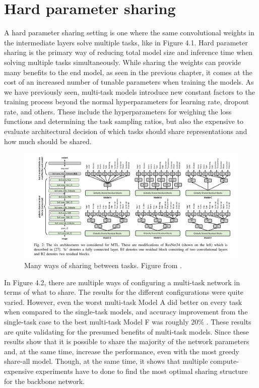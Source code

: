 \section{Hard parameter sharing}
A hard parameter sharing setting is one where the same convolutional weights in the intermediate layers solve multiple tasks, like in Figure 4.1.
Hard parameter sharing is the primary way of reducing total model size and inference time when solving multiple tasks simultaneously.
While sharing the weights can provide many benefits to the end model, as seen in the previous chapter, it comes at the cost of an increased number of tunable parameters when training the models. 
As we have previously seen, multi-task models introduce new constant factors to the training process beyond the normal hyperparameters for learning rate, dropout rate, and others.
These include the hyperparameters for weighing the loss functions and determining the task sampling ratios, but also the expensive to evaluate architectural decision of which tasks should share representations and how much should be shared.

\begin{figure}[h!] 
\centering 
\includegraphics[width=1\textwidth]{imgs/multipleShares.png}
\caption{Many ways of sharing between tasks. Figure from \citep{healthyDrink}.\label{fig:params}}
\end{figure}

In Figure 4.2, there are multiple ways of configuring a multi-task network in terms of what to share.
The results for the different configurations were quite varied. 
However, even the worst multi-task Model A did better on every task when compared to the single-task models, and accuracy improvement from the single-task case to the best multi-task Model F was roughly 20\% \citep{healthyDrink}.
These results are quite validating for the presumed benefits of multi-task models.
Since these results show that it is possible to share the majority of the network parameters and, at the same time, increase the performance, even with the most greedy share-all model.
Though, at the same time, it shows that multiple compute-expensive experiments have to done to find the most optimal sharing structure for the backbone network.


